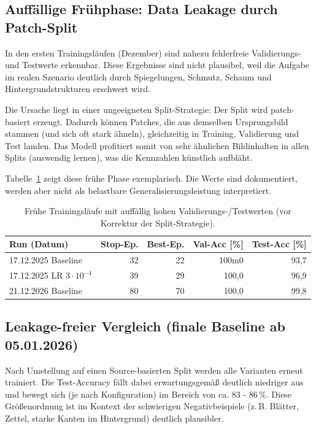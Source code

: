 \subsection{Auffällige Frühphase: Data Leakage durch Patch-Split}
\label{subsec:cnn_leakage}

In den ersten Trainingsläufen (Dezember) sind nahezu fehlerfreie Validierungs- und Testwerte erkennbar. Diese Ergebnisse sind nicht plausibel, weil die Aufgabe im realen Szenario deutlich durch Spiegelungen, Schmutz, Schaum und Hintergrundstrukturen erschwert wird.

Die Ursache liegt in einer ungeeigneten Split-Strategie: Der Split wird patch-basiert erzeugt. Dadurch können Patches, die aus demselben Ursprungsbild stammen (und sich oft stark ähneln), gleichzeitig in Training, Validierung und Test landen. Das Modell profitiert somit von sehr ähnlichen Bildinhalten in allen Splits (\glqq auswendig lernen\grqq{}), was die Kennzahlen künstlich aufbläht.

Tabelle~\ref{tab:cnn_leaky_runs} zeigt diese frühe Phase exemplarisch. Die Werte sind dokumentiert, werden aber nicht als belastbare Generalisierungsleistung interpretiert.

\begin{table}[h]
\centering
\small
\caption{Frühe Trainingsläufe mit auffällig hohen Validierungs-/Testwerten (vor Korrektur der Split-Strategie).}
\begin{tabular}{lrrrr}
    \toprule
    \textbf{Run (Datum)} & \textbf{Stop-Ep.} & \textbf{Best-Ep.} & \textbf{Val-Acc [\%]} & \textbf{Test-Acc [\%]} \\
    \midrule
    17.12.2025 Baseline & 32 & 22 & 100m0 & 93,7 \\
    17.12.2025 LR $3\cdot10^{-4}$ & 39 & 29 & 100,0 & 96,9 \\
    21.12.2026 Baseline & 80 & 70 & 100,0 & 99,8 \\
    \bottomrule
\end{tabular}
\label{tab:cnn_leaky_runs}
\end{table}

\subsection{Leakage-freier Vergleich (finale Baseline ab 05.01.2026)}
\label{subsec:cnn_clean_results}

Nach Umstellung auf einen Source-basierten Split werden alle Varianten erneut trainiert. Die Test-Accuracy fällt dabei erwartungsgemäß deutlich niedriger aus und bewegt sich (je nach Konfiguration) im Bereich von ca. 83 - 86\,\%. Diese Größenordnung ist im Kontext der schwierigen Negativbeispiele (z.\,B. Blätter, Zettel, starke Kanten im Hintergrund) deutlich plausibler.

